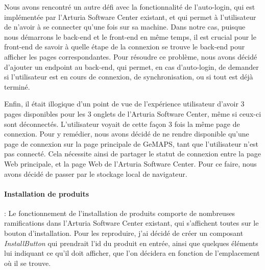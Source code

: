 \documentclass[francais]{rapportPFE}  %
\begin{document}
Nous avons rencontré un autre défi avec la fonctionnalité de l'auto-login, qui est implémentée par l'Arturia Software Center existant, et qui permet à l'utilisateur de n'avoir à se connecter qu'une fois sur sa machine. Dans notre cas, puisque nous démarrons le back-end et le front-end en même temps, il est crucial pour le front-end de savoir à quelle étape de la connexion se trouve le back-end pour afficher les pages correspondantes. Pour résoudre ce problème, nous avons décidé d'ajouter un endpoint au back-end, qui permet, en cas d'auto-login, de demander si l'utilisateur est en cours de connexion, de synchronisation, ou si tout est déjà terminé.

Enfin, il était illogique d'un point de vue de l'expérience utilisateur d'avoir 3 pages disponibles pour les 3 onglets de l'Arturia Software Center, même si ceux-ci sont déconnectés. L'utilisateur voyait de cette façon 3 fois la même page de connexion. Pour y remédier, nous avons décidé de ne rendre disponible qu'une page de connexion sur la page principale de GeMAPS, tant que l'utilisateur n'est pas connecté. Cela nécessite ainsi de partager le statut de connexion entre la page Web principale, et la page Web de l'Arturia Software Center. Pour ce faire, nous avons décidé de passer par le stockage local de navigateur. 


\paragraph{Installation de produits}: Le fonctionnement de l'installation de produits comporte de nombreuses ramifications dans l'Arturia Software Center existant, qui s'affichent toutes sur le bouton d'installation. Pour les reproduire, j'ai décidé de créer un composant \textit{InstallButton} qui prendrait l'id du produit en entrée, ainsi que quelques éléments lui indiquant ce qu'il doit afficher, que l'on décidera en fonction de l'emplacement où il se trouve. 
\end{document}
